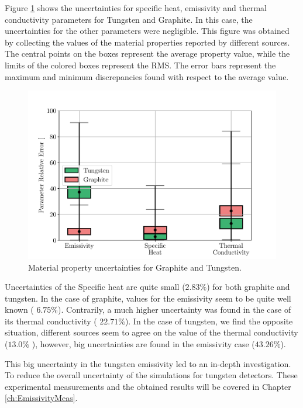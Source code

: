 Figure \ref{fig:MatPropUnc} shows the uncertainties for specific heat, emissivity and thermal conductivity
parameters for Tungsten and Graphite. In this case, the uncertainties for the other parameters were negligible. This figure was obtained by collecting the values of the material properties reported by different sources. The central points on the boxes represent the average property value, while the limits of the colored boxes represent the RMS. The error bars represent the maximum and minimum discrepancies found with respect to the average value. 

\begin{figure}[h]
    \centering
    \includegraphics[width=0.7\columnwidth]{PlotTungstenGraphiteUncertainty/GraphTungsUnc.pdf}
    \caption{Material property uncertainties for Graphite and Tungsten. }
    \label{fig:MatPropUnc}
\end{figure}

Uncertainties of the Specific heat are quite small ($2.83 \% $) for both graphite and tungsten. In the case of graphite, values for the emissivity seem to be quite well known ( $ 6.75\%$). Contrarily, a much higher uncertainty was found in the case of its thermal conductivity ( $ 22.71\%$). In the case of tungsten, we find the opposite situation, different sources seem to agree on the value of the thermal conductivity ($13.0\%$ ), however, big uncertainties are found in the emissivity case ($43.26 \%$). 

This big uncertainty in the tungsten emissivity led to an in-depth investigation. To reduce the overall uncertainty of the simulations for tungsten detectors. These experimental measurements and the obtained results will be covered in Chapter \ref{ch:EmissivityMeas}.